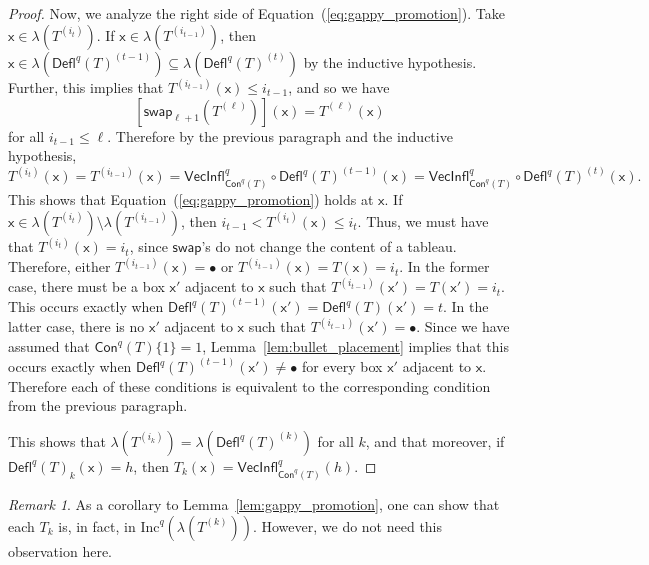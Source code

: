 \documentclass[12pt]{amsart}
\newcommand{\x}{\ensuremath{\mathsf{x}}}
\theoremstyle{definition}
\theoremstyle{remark}
\newtheorem{remark}[theorem]{Remark}
\numberwithin{equation}{section}
\newcommand{\inc}{\ensuremath{\mathrm{Inc}}}
\newcommand{\swap}{\ensuremath{\mathsf{swap}}}
\newcommand{\deflate}{\ensuremath{\mathsf{Defl}}}
\newcommand{\inflate}{\ensuremath{\mathsf{VecInfl}}}
\newcommand{\content}{\ensuremath{\mathsf{Con}}}
\begin{document}
\begin{proof}
Now, we analyze the right side of Equation~(\ref{eq:gappy_promotion}). Take $\x \in \lambda\left( T^{(i_t)} \right)$.   If $\x \in \lambda \left(T^{(i_{t-1})} \right)$, then $\x \in \lambda(\deflate^q(T)^{(t-1)}) \subseteq \lambda(\deflate^q(T)^{(t)})$ by the inductive hypothesis. Further, this implies that $T^{(i_{t-1})}(\x) \leq i_{t-1}$,  and so we have
\[
\left[ \swap_{\ell+1} \left(T^{(\ell)} \right) \right](\x) = T^{(\ell)}(\x)
\]
 for all $i_{t-1} \leq \ell$. Therefore by the previous paragraph and the inductive hypothesis,
 \[ T^{(i_t)}(\x) = T^{(i_{t-1})}(\x) = \inflate^q_{\content^q(T)} \circ \deflate^q(T)^{(t-1)}(\x) =  \inflate^q_{\content^q(T)} \circ \deflate^q(T)^{(t)}(\x). \] This shows that Equation~(\ref{eq:gappy_promotion}) holds at $\x$. If $\x \in \lambda \left(T^{(i_{t})} \right) \setminus \lambda \left(T^{(i_{t-1})} \right)$, then $i_{t-1} < T^{(i_{t})}(\x) \leq i_t$. Thus, we must have that $T^{(i_{t})}(\x) = i_{t}$, since $\swap$'s do not change the content of a tableau. Therefore, either $T^{(i_{t-1})}(\x) = \bullet$ or $T^{(i_{t-1})}(\x) =  T(\x) = i_{t}$. In the former case, there must be a box $\x'$ adjacent to $\x$ such that $T^{(i_{t-1})}(\x') = T(\x') = i_{t}$. This occurs exactly when $\deflate^q(T)^{(t-1)}(\x') = \deflate^q(T)(\x') = t$. In the latter case, there is no $\x'$ adjacent to $\x$ such that $T^{(i_{t-1})}(\x') = \bullet$. Since we have assumed that  $\content^q(T) \lbrace 1 \rbrace = 1$, Lemma~\ref{lem:bullet_placement} implies that this occurs exactly when  $\deflate^q(T)^{(t-1)}(\x') \neq \bullet$ for every box $\x'$ adjacent to $\x$. Therefore each of these conditions is equivalent to the corresponding condition from the previous paragraph. 
 
This shows that $\lambda \left(T^{(i_k)} \right) = \lambda \left(\deflate^q(T)^{(k)} \right)$ for all $k$, and that moreover, if $\deflate^q(T)_{k}(\x) = h$, then $T_k(\x) = \inflate^q_{\content^q(T)}(h)$. 
\end{proof}

\begin{remark}
As a corollary to Lemma~\ref{lem:gappy_promotion}, one can show that each $T_k$ is, in fact, in $\inc^q \left(\lambda \left( T^{(k)} \right) \right)$. However, we do not need this observation here.
\end{remark}
\end{document}

